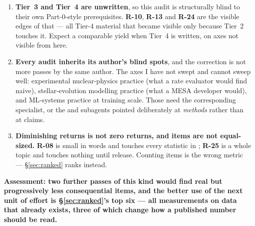 \begin{enumerate}
\item \textbf{Tier~3 and Tier~4 are unwritten}, so this audit is structurally
  blind to their own Part-0-style prerequisites. \textbf{R-10}, \textbf{R-13}
  and \textbf{R-24} are the visible edges of that --- all Tier-4 material that
  became visible only because Tier~2 touches it. Expect a comparable yield when
  Tier~4 is written, on axes not visible from here.
\item \textbf{Every audit inherits its author's blind spots}, and the correction
  is not more passes by the same author. The axes I have not swept and cannot
  sweep well: experimental nuclear-physics practice (what a rate evaluator would
  find naive), stellar-evolution modelling practice (what a MESA developer
  would), and ML-systems practice at training scale. Those need the
  corresponding specialist, or the  and 
  subagents pointed deliberately at \emph{methods} rather than at claims.
\item \textbf{Diminishing returns is not zero returns, and items are not
  equal-sized.} \textbf{R-08} is small in words and touches every statistic in
  ; \textbf{R-25} is a whole topic and touches nothing until
  release. Counting items is the wrong metric --- \S\ref{sec:ranked} ranks
  instead.
\end{enumerate}

\begin{result}
\textbf{Assessment: two further passes of this kind would find real but
progressively less consequential items, and the better use of the next unit of
effort is \S\ref{sec:ranked}'s top six --- all measurements on data that already
exists, three of which change how a published number should be read.}
\end{result}
